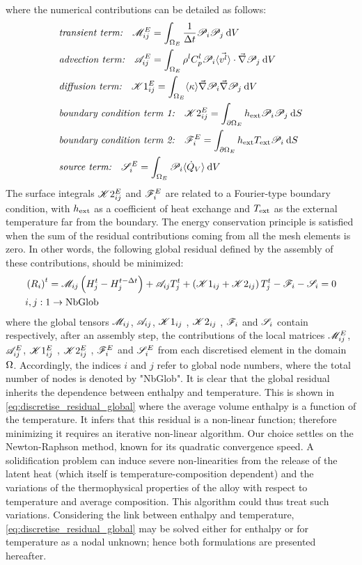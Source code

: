 where the numerical contributions can be detailed as follows:
\begin{align}
& \textit{transient term:} \quad  \mathscr{M}_{ij}^E = \int_{\Omega_E} \frac{1}{\Delta t} \mathscr{P}_i \mathscr{P}_j \: \mathrm{d}V \\ 
& \textit{advection term:} \quad  \mathscr{A}_{ij}^E = \int_{\Omega_E} \rho^l C_p^l \mathscr{P}_i \langle \vec{v^l} \rangle \cdot \vec{\nabla} \mathscr{P}_j\: \mathrm{d}V \\ 
& \textit{diffusion term:} \quad  \mathscr{K}1_{ij}^E = \int_{\Omega_E} \langle \kappa \rangle \vec{\nabla} \mathscr{P}_i\vec{\nabla} \mathscr{P}_j\: \mathrm{d}V \\ 
& \textit{boundary condition term 1:}	\quad  \mathscr{K}2_{ij}^E = \int_{\partial \Omega_E} h_{\text{ext}} \mathscr{P}_i \mathscr{P}_j\: \mathrm{d}S \\ 
& \textit{boundary condition term 2:}	\quad	\mathscr{F}_{i}^E = \int_{\partial \Omega_E} h_{\text{ext}} T_{\text{ext}} \mathscr{P}_i\: \mathrm{d}S \\
& \textit{source term:} \quad  \mathscr{S}_{i}^E = \int_{\Omega_E} \mathscr{P}_i \langle \dot{Q}_{{V}} \rangle\: \mathrm{d}V
\end{align}
%
The surface integrals $\mathscr{K}2_{ij}^E$ and $\mathscr{F}_{i}^E$ are related to a Fourier-type boundary condition, 
with $h_{\text{ext}}$ as a coefficient of heat exchange and $T_{\text{ext}}$ as the external temperature far from the 
boundary. The energy conservation principle is satisfied when the sum of the residual contributions 
coming from all the mesh elements is zero. In other words, the following global residual defined by 
the assembly of these contributions, should be minimized: 
\begin{align}
\begin{split}
\label{eq:discretise_residual_global}
& \left( R_i \right)^t = \mathscr{M}_{ij} \left( H_j^t - H_j^{t-\Delta t} \right) + \mathscr{A}_{ij} T_j^t + \left( \mathscr{K}1_{ij} + \mathscr{K}2_{ij} \right)T_j^t -\mathscr{F}_{i} - \mathscr{S}_{i}=0 \\
& i,j:1 \rightarrow \text{NbGlob}
\end{split}
\end{align}
where the global tensors $\mathscr{M}_{ij}$, $\mathscr{A}_{ij}$, $\mathscr{K}1_{ij}$ , $\mathscr{K}2_{ij}$ , $\mathscr{F}_{i}$ and $\mathscr{S}_{i}$ contain respectively, after an assembly step, 
the contributions of the local matrices $\mathscr{M}_{ij}^E$, $\mathscr{A}_{ij}^E$, $\mathscr{K}1_{ij}^E$ , $\mathscr{K}2_{ij}^E$ , $\mathscr{F}_{i}^E$ and $\mathscr{S}_{i}^E$ from each discretised 
element in the domain $\Omega$. Accordingly, the indices $i$ and $j$ refer to global node numbers, where the total number of nodes is 
denoted by "NbGlob". It is clear that the global residual inherits the dependence between enthalpy and temperature. 
This is shown in \cref{eq:discretise_residual_global} where the average volume enthalpy is a function of the temperature. It infers that this residual 
is a non-linear function; therefore minimizing it requires an iterative non-linear algorithm. Our choice settles on the 
Newton-Raphson method, known for its quadratic convergence speed. A solidification problem can induce severe non-linearities 
from the release of the latent heat (which itself is temperature-composition dependent) and the variations of the thermophysical 
properties of the alloy with respect to temperature and average composition. This algorithm could thus treat such variations. 
Considering the link between enthalpy and temperature, \cref{eq:discretise_residual_global} may be solved either for enthalpy 
or for temperature as a nodal unknown; hence both formulations are presented hereafter.
%
%
